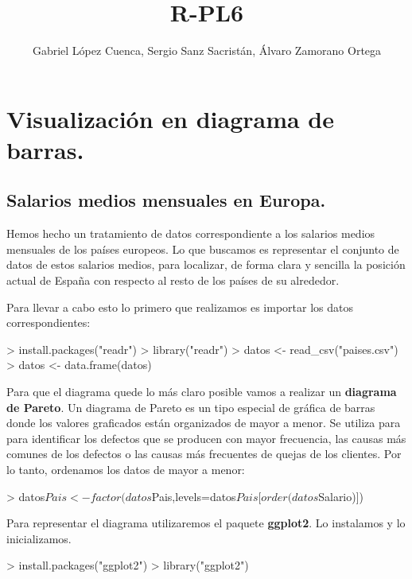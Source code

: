 \documentclass [a4paper] {article}
\title{R-PL6}
\author{Gabriel López Cuenca, Sergio Sanz Sacristán, Álvaro Zamorano Ortega}
\begin{document}


\maketitle

\graphicspath{ {./tmp/} }

\section{Visualización en diagrama de barras.}

\subsection{Salarios medios mensuales en Europa.}
\bigskip
Hemos hecho un tratamiento de datos correspondiente a los salarios medios mensuales de los países europeos.
Lo que buscamos es representar el conjunto de datos de estos salarios medios, para localizar, de forma clara
y sencilla la posición actual de España con respecto al resto de los países de su alrededor.

\bigskip
Para llevar a cabo esto lo primero que realizamos es importar los datos correspondientes:
\begin{Schunk}
\begin{Sinput}
> install.packages("readr")
> library("readr")
> datos <- read_csv("paises.csv")
> datos <- data.frame(datos)
\end{Sinput}
\end{Schunk}

\bigskip
Para que el diagrama quede lo más claro posible vamos a realizar un \textbf{diagrama de Pareto}. Un diagrama
de Pareto es un tipo especial de gráfica de barras donde los valores graficados están organizados de mayor a 
menor. Se utiliza para para identificar los defectos que se producen con mayor frecuencia, las causas más 
comunes de los defectos o las causas más frecuentes de quejas de los clientes. Por lo tanto, ordenamos los
datos de mayor a menor:
\begin{Schunk}
\begin{Sinput}
> datos$Pais <- factor(datos$Pais,levels=datos$Pais[order(datos$Salario)])
\end{Sinput}
\end{Schunk}

\bigskip
Para representar el diagrama utilizaremos el paquete \textbf{ggplot2}. Lo instalamos y lo inicializamos.
\begin{Schunk}
\begin{Sinput}
> install.packages("ggplot2")
> library("ggplot2")
\end{Sinput}
\end{Schunk}
\end{document}
